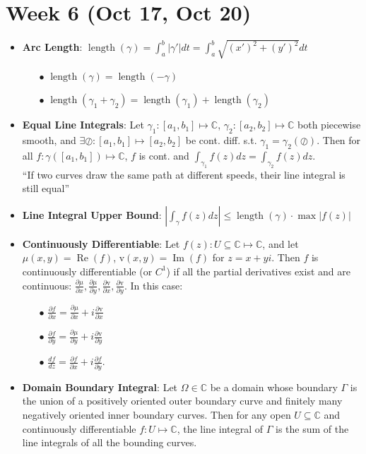 \documentclass[12pt]{article}
\newcommand{\C}{\mathbb{C}}
\DeclareMathOperator{\real}{Re}
\DeclareMathOperator{\imgn}{Im}
\DeclareMathOperator{\len}{length}
\begin{document}
\section*{Week 6 (Oct 17, Oct 20)}
\begin{itemize}
    \item \textbf{Arc Length}: $\len(\gamma)=\int_a^b|\gamma'|dt=\int_a^b\sqrt{(x')^2+(y')^2}dt$
    \begin{itemize}
        \item[$\bullet$] $\len(\gamma)=\len(-\gamma)$
        \item[$\bullet$] $\len(\gamma_1+\gamma_2)=\len(\gamma_1)+\len(\gamma_2)$
    \end{itemize}
    \item \textbf{Equal Line Integrals}: Let $\gamma_1:[a_1,b_1]\mapsto\C$, $\gamma_2:[a_2,b_2]\mapsto\C$ both piecewise smooth, and $\exists\oslash:[a_1,b_1]\mapsto[a_2,b_2]$ be cont. diff. s.t. $\gamma_1=\gamma_2(\oslash)$. Then for all $f:\gamma([a_1,b_1])\mapsto\C$, $f$ is cont. and $\int_{\gamma_1}f(z)dz=\int_{\gamma_2}f(z)dz$. \\
    ``If two curves draw the same path at different speeds, their line integral is still equal''
    \item \textbf{Line Integral Upper Bound}: $\left|\int_\gamma f(z)dz\right|\leq\len(\gamma)\cdot\max|f(z)|$
    \item \textbf{Continuously Differentiable}: Let $f(z):U\subseteq\C\mapsto\C$, and let $\mu(x,y)=\real(f)$, $\mathrm{v}(x,y)=\imgn(f)$ for $z=x+yi$. Then $f$ is continuously differentiable (or $C^1$) if all the partial derivatives exist and are continuous: $\frac{\partial\mu}{\partial x},\frac{\partial\mu}{\partial y},\frac{\partial\mathrm{v}}{\partial x},\frac{\partial\mathrm{v}}{\partial y}$. In this case:
    \begin{itemize}
        \item[$\bullet$] $\frac{\partial f}{\partial x}=\frac{\partial\mu}{\partial x}+i\frac{\partial\mathrm{v}}{\partial x}$
        \item[$\bullet$] $\frac{\partial f}{\partial y}=\frac{\partial\mu}{\partial y}+i\frac{\partial\mathrm{v}}{\partial y}$
        \item[$\bullet$] $\frac{df}{dz}=\frac{\partial f}{\partial x}+i\frac{\partial f}{\partial y}$.
    \end{itemize}
    \item \textbf{Domain Boundary Integral}: Let $\Omega\in\C$ be a domain whose boundary $\Gamma$ is the union of a positively oriented outer boundary curve and finitely many negatively oriented inner boundary curves. Then for any open $U\subseteq\C$ and continuously differentiable $f:U\mapsto\C$, the line integral of $\Gamma$ is the sum of the line integrals of all the bounding curves.

\end{itemize}
\end{document}
